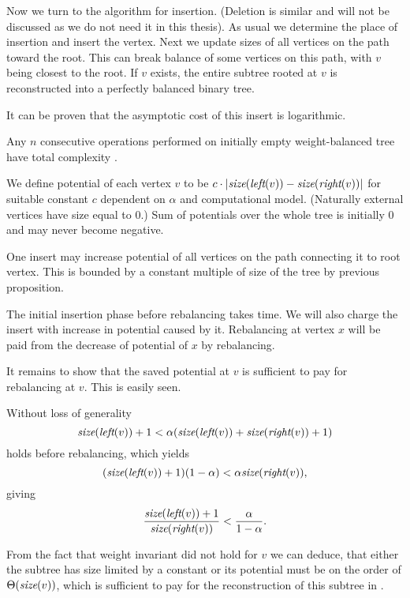 Now we turn to the algorithm for insertion. (Deletion is similar and will not be discussed as we do not need it in this thesis). As usual we determine the place of insertion and insert the vertex. Next we update sizes of all vertices on the path toward the root. This can break balance of some vertices on this path, with $v$ being closest to the root. If $v$ exists, the entire subtree rooted at $v$ is reconstructed into a perfectly balanced binary tree.

It can be proven that the asymptotic cost of this insert is logarithmic.

\begin{prop}
Any $n$ consecutive operations performed on initially empty weight-balanced tree have total complexity . 
\end{prop}

\begin{myproof}
We define potential of each vertex $v$ to be $c \cdot |\text{\it size}(\text{\it left}(v)) - \text{\it size}(\text{\it right}(v))|$ for suitable constant $c$ dependent on $\alpha$ and computational model. (Naturally external vertices have size equal to 0.) Sum of potentials over the whole tree is initially 0 and may never become negative.

One insert may increase potential of all vertices on the path connecting it to root vertex. This is bounded by a constant multiple of size of the tree by previous proposition.

The initial insertion phase before rebalancing takes  time. We will also charge the insert with increase in potential caused by it. Rebalancing at vertex $x$ will be paid from the decrease of potential of $x$ by rebalancing. 

It remains to show that the saved potential at $v$ is sufficient to pay for rebalancing at $v$. This is easily seen. 

Without loss of generality
$$ \text{\it size}(\text{\it left}(v)) + 1 < \alpha ( \text{\it size}(\text{\it left}(v)) + \text{\it size}(\text{\it right}(v)) + 1 ) $$
holds before rebalancing, which yields
$$ (\text{\it size}(\text{\it left}(v)) + 1)(1 - \alpha) < \alpha \text{\it size}(\text{\it right}(v)), $$
giving
$$ { \text{\it size}(\text{\it left}(v)) + 1 \over \text{\it size}(\text{\it right}(v)) } < { \alpha \over 1 - \alpha }. $$

From the fact that weight invariant did not hold for $v$ we can deduce, that either the subtree has size limited by a constant or its potential must be on the order of $\Theta(\text{\it size}(v))$, which is sufficient to pay for the reconstruction of this subtree in . 
\end{myproof}